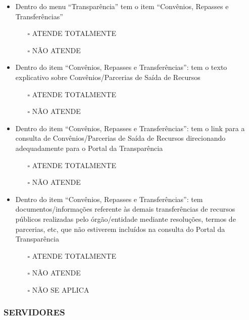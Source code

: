 \documentclass[
]{book}
\providecommand{\tightlist}{%
  \setlength{\itemsep}{0pt}\setlength{\parskip}{0pt}}
\begin{document}
\begin{itemize}
\tightlist
\item
  Dentro do menu ``Transparência'' tem o item ``Convênios, Repasses e Transferências''

  \begin{itemize}
  \tightlist
  \item[$\square$]
    ATENDE TOTALMENTE
  \item[$\square$]
    NÃO ATENDE
  \end{itemize}
\item
  Dentro do item ``Convênios, Repasses e Transferências'': tem o texto explicativo sobre Convênios/Parcerias de Saída de Recursos

  \begin{itemize}
  \tightlist
  \item[$\square$]
    ATENDE TOTALMENTE
  \item[$\square$]
    NÃO ATENDE
  \end{itemize}
\item
  Dentro do item ``Convênios, Repasses e Transferências'': tem o link para a consulta de Convênios/Parcerias de Saída de Recursos direcionando adequadamente para o Portal da Transparência

  \begin{itemize}
  \tightlist
  \item[$\square$]
    ATENDE TOTALMENTE
  \item[$\square$]
    NÃO ATENDE
  \end{itemize}
\item
  Dentro do item ``Convênios, Repasses e Transferências'': tem documentos/informações referente às demais transferências de recursos públicos realizadas pelo órgão/entidade mediante resoluções, termos de parcerias, etc, que não estiverem incluídos na consulta do Portal da Transparência

  \begin{itemize}
  \tightlist
  \item[$\square$]
    ATENDE TOTALMENTE
  \item[$\square$]
    NÃO ATENDE
  \item[$\square$]
    NÃO SE APLICA
  \end{itemize}
\end{itemize}

\hypertarget{servidores-1}{%
\subsubsection*{SERVIDORES}\label{servidores-1}}
\end{document}
